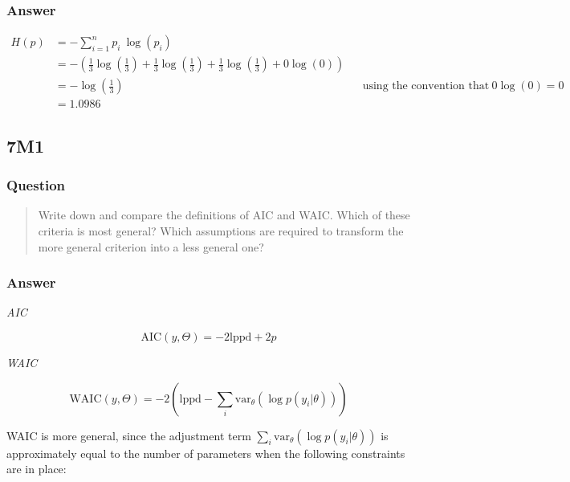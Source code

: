 \documentclass[
]{book}
\begin{document}
\hypertarget{answer-63}{%
\subsubsection*{Answer}\label{answer-63}}

\[\begin{aligned}
H(p) &= -\sum^n_{i=1}p_i \ \log(p_i) \\
&= -(\frac{1}{3}  \log(\frac{1}{3}) + \frac{1}{3}  \log(\frac{1}{3}) + \frac{1}{3}  \log(\frac{1}{3}) + 0  \log(0))\\
&= -\log(\frac{1}{3}) &&\text{using the convention that } 0  \log(0) = 0 \\
&= 1.0986
\end{aligned}\]

\hypertarget{m1-4}{%
\subsection*{7M1}\label{m1-4}}

\hypertarget{question-64}{%
\subsubsection*{Question}\label{question-64}}

\begin{quote}
Write down and compare the definitions of AIC and WAIC. Which of these criteria is most general? Which assumptions are required to transform the more general criterion into a less general one?
\end{quote}

\hypertarget{answer-64}{%
\subsubsection*{Answer}\label{answer-64}}

\emph{AIC}

\[
\text{AIC}(y,\Theta) = -2 \text{lppd} + 2p
\]

\emph{WAIC}

\[
\text{WAIC}(y,\Theta) = -2 \left( \text{lppd} - \sum_i \text{var}_\theta ( \log p(y_i | \theta)) \right)
\]

WAIC is more general, since the adjustment term \(\sum_i \text{var}_\theta ( \log p(y_i | \theta))\) is approximately equal to the number of parameters when the following constraints are in place:
\end{document}
